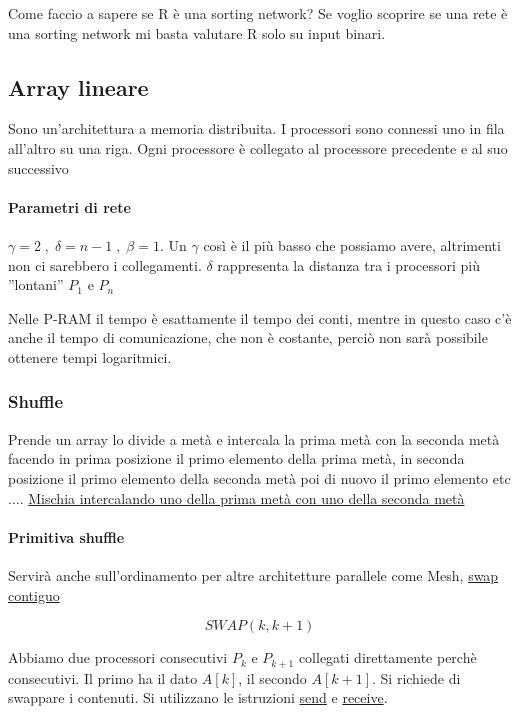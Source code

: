 \begin{osservazione}
Come faccio a sapere se R è una sorting network? Se voglio scoprire se una rete è una sorting network mi basta valutare R solo su input binari.
\end{osservazione}

\subsection{Array lineare}
Sono un'architettura a memoria distribuita. I processori sono connessi uno in fila all'altro su una riga. Ogni processore è collegato al processore precedente e al suo successivo

\paragraph{Parametri di rete}
$\gamma = 2\;, \;\delta = n-1\; ,\; \beta = 1$. Un $\gamma$ così è il più basso che possiamo avere, altrimenti non ci sarebbero i collegamenti. $\delta$ rappresenta la distanza tra i processori più ”lontani” $P_1$ e $P_n$

Nelle P-RAM il tempo è esattamente il tempo dei conti, mentre in questo caso c'è anche il tempo di comunicazione, che non è costante, perciò non sarà possibile ottenere tempi logaritmici.

\subsubsection{Shuffle}
Prende un array lo divide a metà e intercala la prima metà con la seconda metà facendo in prima posizione il primo elemento della prima metà, in seconda posizione il primo elemento della seconda metà poi di nuovo il primo elemento etc$\dots$.   \uline{Mischia intercalando uno della prima metà con uno della seconda metà}

\paragraph{Primitiva shuffle}
Servirà anche sull'ordinamento per altre architetture parallele come Mesh, \uline{swap contiguo}

$$SWAP (k, k+1)$$

Abbiamo due processori consecutivi $P_k$ e $P_{k+1}$ collegati direttamente perchè consecutivi. Il primo ha il dato $A[k]$, il secondo $A[k+1]$. Si richiede di swappare i contenuti. Si utilizzano le istruzioni \uline{send} e \uline{receive}.

